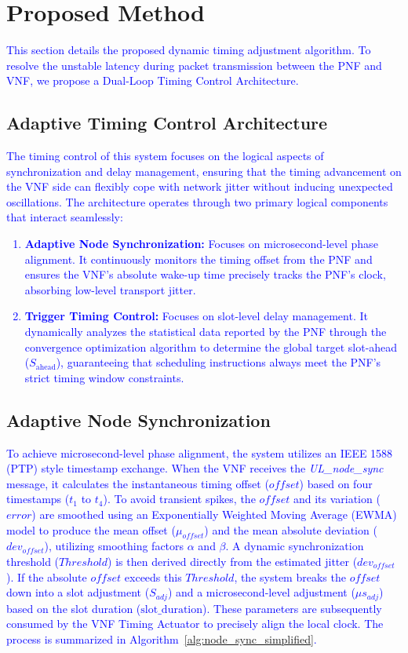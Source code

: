 \documentclass[../my_ntust_thesis.tex]{subfiles}
\begin{document}
\chapter{Proposed Method}
\label{sec:method}

\textcolor{blue}{This section details the proposed dynamic timing adjustment algorithm. To resolve the unstable latency during packet transmission between the PNF and VNF, we propose a Dual-Loop Timing Control Architecture.}

\section{Adaptive Timing Control Architecture}
\label{subsec:timing_control_architecture}

\textcolor{blue}{The timing control of this system focuses on the logical aspects of synchronization and delay management, ensuring that the timing advancement on the VNF side can flexibly cope with network jitter without inducing unexpected oscillations. The architecture operates through two primary logical components that interact seamlessly:
\begin{enumerate}
    \item \textbf{Adaptive Node Synchronization:} Focuses on microsecond-level phase alignment. It continuously monitors the timing offset from the PNF and ensures the VNF's absolute wake-up time precisely tracks the PNF's clock, absorbing low-level transport jitter.
    \item \textbf{Trigger Timing Control:} Focuses on slot-level delay management. It dynamically analyzes the statistical data reported by the PNF through the convergence optimization algorithm to determine the global target slot-ahead ($S_{\text{ahead}}$), guaranteeing that scheduling instructions always meet the PNF's strict timing window constraints.
\end{enumerate}}

\section{Adaptive Node Synchronization}
\label{subsec:node_sync}
\textcolor{blue}{To achieve microsecond-level phase alignment, the system utilizes an IEEE 1588 (PTP) style timestamp exchange. When the VNF receives the \textit{UL\_node\_sync} message, it calculates the instantaneous timing offset ($offset$) based on four timestamps ($t_1$ to $t_4$). To avoid transient spikes, the $offset$ and its variation ($error$) are smoothed using an Exponentially Weighted Moving Average (EWMA) model to produce the mean offset ($\mu_{offset}$) and the mean absolute deviation ($dev_{offset}$), utilizing smoothing factors $\alpha$ and $\beta$. A dynamic synchronization threshold ($Threshold$) is then derived directly from the estimated jitter ($dev_{offset}$). If the absolute $offset$ exceeds this $Threshold$, the system breaks the $offset$ down into a slot adjustment ($S_{adj}$) and a microsecond-level adjustment ($\mu s_{adj}$) based on the slot duration ($\text{slot\_duration}$). These parameters are subsequently consumed by the VNF Timing Actuator to precisely align the local clock. The process is summarized in Algorithm~\ref{alg:node_sync_simplified}.}
\end{document}
